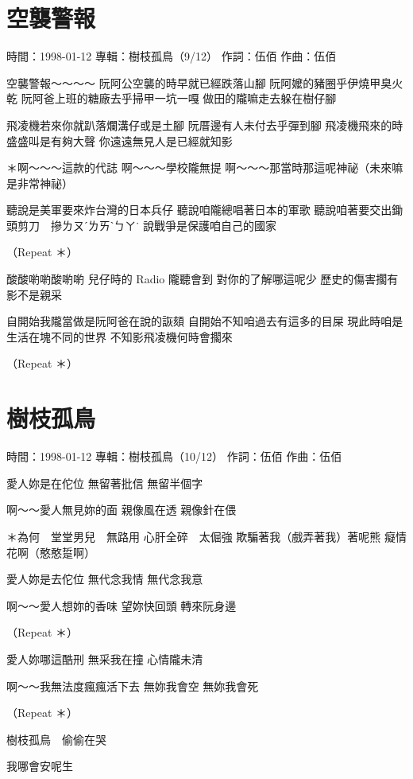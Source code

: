 \documentclass[UTF8,a4paper,oneside,twocolumn,12pt]{ctexbook}
\newcommand{\infopair}[2]{\textbullet #1：#2}
\newcommand{\zc}[1][伍佰]{\infopair{作詞}{#1}}
\newcommand{\zq}[1][伍佰]{\infopair{作曲}{#1}}
\newcommand{\zj}[1]{\infopair{專輯}{#1}}
\newcommand{\sj}[1]{\infopair{時間}{#1}}
\newenvironment{info}{\begin{flushleft}\kaishu
	}
	{\end{flushleft}\normalsize\yahei\par}
\newenvironment{lyric}{
	}
{}
\begin{document}
\section{空襲警報}
\begin{info}
	\sj{1998-01-12}
	\zj{樹枝孤鳥（9/12）}
	\zc
	\zq
\end{info}
\begin{lyric}
	空襲警報～～～～
	阮阿公空襲的時早就已經跌落山腳
	阮阿嬤的豬圈乎伊燒甲臭火乾
	阮阿爸上班的糖廠去乎掃甲一坑一嘎
	做田的隴嘛走去躲在樹仔腳

	飛凌機若來你就趴落爛溝仔或是土腳
	阮厝邊有人未付去乎彈到腳
	飛凌機飛來的時盛盛叫是有夠大聲
	你遠遠無見人是已經就知影

	＊啊～～～這款的代誌
	啊～～～學校隴無提
	啊～～～那當時那這呢神祕（未來嘛是非常神祕）

	聽說是美軍要來炸台灣的日本兵仔
	聽說咱隴總唱著日本的軍歌
	聽說咱著要交出鋤頭剪刀　摻ㄌㄡˊㄌㄞˋㄅㄚ˙
	說戰爭是保護咱自己的國家

	（Repeat ＊）

	酸酸喲喲酸喲喲
	兒仔時的 Radio 隴聽會到
	對你的了解哪這呢少
	歷史的傷害擱有影不是親采

	自開始我隴當做是阮阿爸在說的詼頦
	自開始不知咱過去有這多的目屎
	現此時咱是生活在塊不同的世界
	不知影飛凌機何時會擱來

	（Repeat ＊）
\end{lyric}

\section{樹枝孤鳥}
\begin{info}
	\sj{1998-01-12}
	\zj{樹枝孤鳥（10/12）}
	\zc
	\zq
\end{info}
\begin{lyric}
	愛人妳是在佗位
	無留著批信
	無留半個字

	啊～～愛人無見妳的面
	親像風在透
	親像針在偎

	＊為何　堂堂男兒　無路用
	心肝全碎　太倔強
	欺騙著我（戲弄著我）著呢熊
	癡情花啊（憨憨踅啊）

	愛人妳是去佗位
	無代念我情
	無代念我意

	啊～～愛人想妳的香味
	望妳快回頭
	轉來阮身邊

	（Repeat ＊）

	愛人妳哪這酷刑
	無采我在撞
	心情隴未清

	啊～～我無法度瘋瘋活下去
	無妳我會空
	無妳我會死

	（Repeat ＊）

	樹枝孤鳥　偷偷在哭

	我哪會安呢生
\end{lyric}
\end{document}
